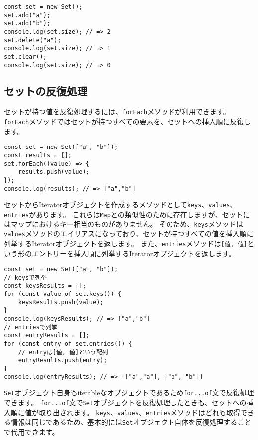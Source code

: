 \begin{lstlisting}
const set = new Set();
set.add("a");
set.add("b");
console.log(set.size); // => 2
set.delete("a");
console.log(set.size); // => 1
set.clear();
console.log(set.size); // => 0
\end{lstlisting}

\hypertarget{set-iteration}{%
\subsection{セットの反復処理}\label{set-iteration}}

セットが持つ値を反復処理するには、\texttt{forEach}メソッドが利用できます。
\texttt{forEach}メソッドではセットが持つすべての要素を、セットへの挿入順に反復します。

\begin{lstlisting}
const set = new Set(["a", "b"]);
const results = [];
set.forEach((value) => {
    results.push(value);
});
console.log(results); // => ["a","b"]
\end{lstlisting}

セットからIteratorオブジェクトを作成するメソッドとして\texttt{keys}、\texttt{values}、\texttt{entries}があります。
これらは\texttt{Map}との類似性のために存在しますが、セットにはマップにおけるキー相当のものがありません。
そのため、\texttt{keys}メソッドは\texttt{values}メソッドのエイリアスになっており、セットが持つすべての値を挿入順に列挙するIteratorオブジェクトを返します。
また、\texttt{entries}メソッドは\texttt{[値, 値]}という形のエントリーを挿入順に列挙するIteratorオブジェクトを返します。

\begin{lstlisting}
const set = new Set(["a", "b"]);
// keysで列挙
const keysResults = [];
for (const value of set.keys()) {
    keysResults.push(value);
}
console.log(keysResults); // => ["a","b"]
// entriesで列挙
const entryResults = [];
for (const entry of set.entries()) {
    // entryは[値, 値]という配列
    entryResults.push(entry);
}
console.log(entryResults); // => [["a","a"], ["b", "b"]]
\end{lstlisting}

\texttt{Set}オブジェクト自身もiterableなオブジェクトであるため\texttt{for...of}文で反復処理できます。
\texttt{for...of}文で\texttt{Set}オブジェクトを反復処理したときも、セットへの挿入順に値が取り出されます。
\texttt{keys}、\texttt{values}、\texttt{entries}メソッドはどれも取得できる情報は同じであるため、基本的には\texttt{Set}オブジェクト自体を反復処理することで代用できます。

